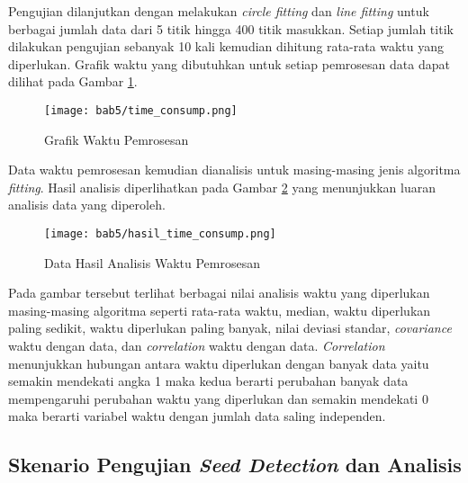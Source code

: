 Pengujian dilanjutkan dengan melakukan \textit{circle fitting} dan \textit{line fitting} untuk berbagai jumlah data dari 5 titik hingga 400 titik masukkan. Setiap jumlah titik dilakukan pengujian sebanyak 10 kali kemudian dihitung rata-rata waktu yang diperlukan. Grafik waktu yang dibutuhkan untuk setiap pemrosesan data dapat dilihat pada Gambar \ref*{fig:Ch05_time_consump}.
\begin{figure}[H]
    \centering
    \texttt{[image: bab5/time\_consump.png]}
    \caption{Grafik Waktu Pemrosesan}
        \label{fig:Ch05_time_consump}
\end{figure}
Data waktu pemrosesan kemudian dianalisis untuk masing-masing jenis algoritma \textit{fitting}. Hasil analisis diperlihatkan pada Gambar \ref*{fig:Ch05_hasil_time_consump} yang menunjukkan luaran analisis data yang diperoleh. 
\begin{figure}[H]
    \centering
    \texttt{[image: bab5/hasil\_time\_consump.png]}
    \caption{Data Hasil Analisis Waktu Pemrosesan}
        \label{fig:Ch05_hasil_time_consump}
\end{figure}
\noindent Pada gambar tersebut terlihat berbagai nilai analisis waktu yang diperlukan masing-masing algoritma seperti rata-rata waktu, median, waktu diperlukan paling sedikit, waktu diperlukan paling banyak, nilai deviasi standar, \textit{covariance} waktu dengan data, dan \textit{correlation} waktu dengan data. \textit{Correlation} menunjukkan hubungan antara waktu diperlukan dengan banyak data yaitu semakin mendekati angka 1 maka kedua berarti perubahan banyak data mempengaruhi perubahan waktu yang diperlukan dan semakin mendekati 0 maka berarti variabel waktu dengan jumlah data saling independen.

\subsection{Skenario Pengujian \textit{Seed Detection} dan Analisis}
\label{subsec:Skenario53}

